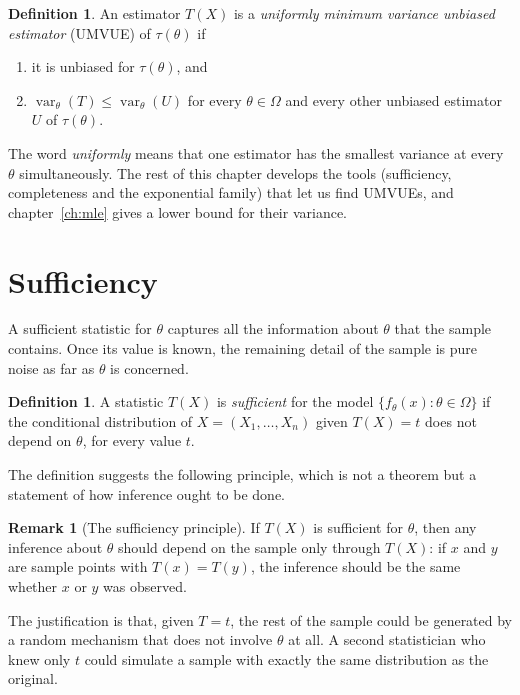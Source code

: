 \documentclass[12pt,a4paper]{report}
\theoremstyle{definition}
\newtheorem{defn}[thm]{Definition}
\newtheorem*{remark}{Remark}
\DeclareMathOperator{\var}{var}
\begin{document}
\begin{defn}
\label{def:umvue}
An estimator $T(X)$ is a \emph{uniformly minimum variance unbiased estimator}
(UMVUE) of $\tau(\theta)$ if
\begin{enumerate}
\item[(i)] it is unbiased for $\tau(\theta)$, and
\item[(ii)] $\var_\theta(T)\le\var_\theta(U)$ for every $\theta\in\Omega$ and every
other unbiased estimator $U$ of $\tau(\theta)$.
\end{enumerate}
\end{defn}

The word \emph{uniformly} means that one estimator has the smallest variance at
every $\theta$ simultaneously. The rest of this chapter develops the tools
(sufficiency, completeness and the exponential family) that let us find UMVUEs,
and chapter~\ref{ch:mle} gives a lower bound for their variance.

\section{Sufficiency}

A sufficient statistic for $\theta$ captures all the information about $\theta$
that the sample contains. Once its value is known, the remaining detail of the
sample is pure noise as far as $\theta$ is concerned.

\begin{defn}
\label{def:sufficient}
A statistic $T(X)$ is \emph{sufficient} for the model
$\{f_\theta(x) : \theta\in\Omega\}$ if the conditional distribution of
$X = (X_1, \dots, X_n)$ given $T(X) = t$ does not depend on $\theta$, for every
value $t$.
\end{defn}

The definition suggests the following principle, which is not a theorem but a
statement of how inference ought to be done.

\begin{remark}[The sufficiency principle]
If $T(X)$ is sufficient for $\theta$, then any inference about $\theta$ should
depend on the sample only through $T(X)$: if $x$ and $y$ are sample points with
$T(x) = T(y)$, the inference should be the same whether $x$ or $y$ was observed.
\end{remark}

The justification is that, given $T = t$, the rest of the sample could be
generated by a random mechanism that does not involve $\theta$ at all. A second
statistician who knew only $t$ could simulate a sample with exactly the same
distribution as the original.
\end{document}
